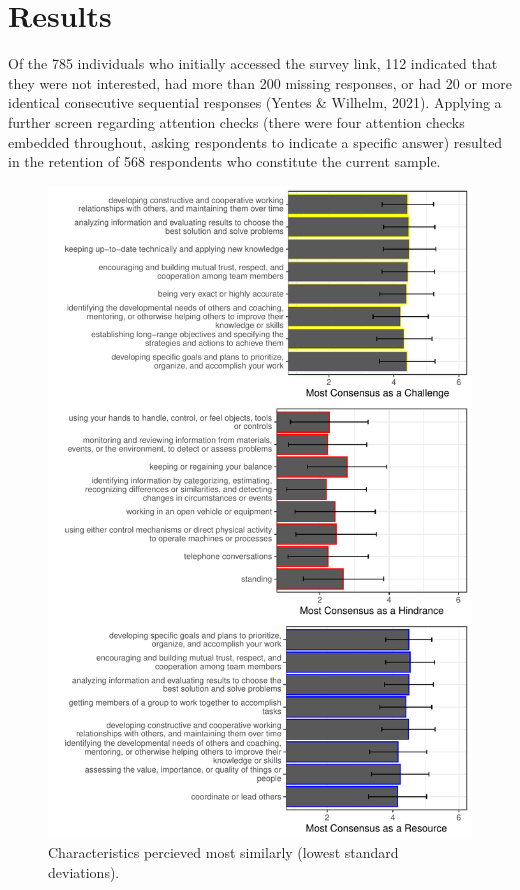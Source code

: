 \documentclass[
  man]{apa7}
\begin{document}
\section{Results}\label{results}

Of the 785 individuals who initially accessed the survey link, 112 indicated that they were not interested, had more than 200 missing responses, or had 20 or more identical consecutive sequential responses (Yentes \& Wilhelm, 2021). Applying a further screen regarding attention checks (there were four attention checks embedded throughout, asking respondents to indicate a specific answer) resulted in the retention of 568 respondents who constitute the current sample.

\begin{figure}
\centering
\includegraphics{Submission_files/figure-latex/combinegraphs-1.pdf}
\caption{\label{fig:combinegraphs}Characteristics percieved most similarly (lowest standard deviations).}
\end{figure}
\end{document}

